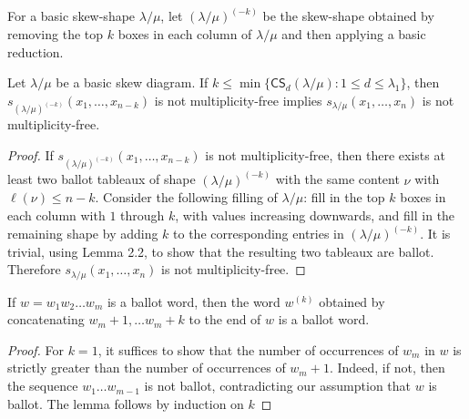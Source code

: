 \documentclass[ALCO,ThmDefs,Unicode,epreuves]{cedram}
\newcommand{\CS	}{\mathsf{CS}}
\begin{document}
\begin{defi}
For a basic skew-shape $\lambda/\mu$, let $(\lambda/\mu)^{(-k)}$ be the skew-shape obtained by removing the top $k$ boxes in each column of $\lambda/\mu$ and then applying a basic reduction.
\end{defi}
\begin{lemma}\label{Lemma:krowreduction}
Let $\lambda / \mu$ be a basic skew diagram. If $k\leq \min\{ \CS _d(\lambda/\mu):1\leq d\leq \lambda_1\}$, then $s_{(\lambda/\mu)^{(-k)}}(x_1,\ldots,x_{n-k})$ is not multiplicity-free implies $s_{\lambda/\mu}(x_1,\ldots,x_n)$ is not multiplicity-free.
\end{lemma}
\begin{proof}
If $s_{(\lambda/\mu)^{(-k)}}(x_1,\ldots,x_{n-k})$ is not multiplicity-free, then there exists at least two ballot tableaux of shape $(\lambda/\mu)^{(-k)}$ with the same content $\nu$ with $\ell(\nu)\leq n-k$. Consider the following filling of $\lambda/\mu$: fill in the top $k$ boxes in each column with $1$ through $k$, with values increasing downwards, and fill in the remaining shape by adding $k$ to the corresponding entries in $(\lambda/\mu)^{(-k)}$. It is trivial, using Lemma 2.2, to show that the resulting two tableaux are ballot. Therefore $s_{\lambda/\mu}(x_1,\ldots,x_n)$ is not multiplicity-free.
\end{proof}
\begin{lemma}\label{Lemma:ballot}
If $w = w_1w_2\ldots w_m$ is a ballot word, then the word $w^{(k)}$ obtained by concatenating $w_m+1,\ldots w_m+k$ to the end of $w$ is a ballot word.
\end{lemma}

\begin{proof}
For $k=1$, it suffices to show that the number of occurrences of $w_m$ in $w$ is strictly greater than the number of occurrences of $w_m+1$. Indeed, if not, then the sequence $w_1\ldots w_{m-1}$ is not ballot, contradicting our assumption that $w$ is ballot. The lemma follows by induction on $k$
\end{proof}
\end{document}
